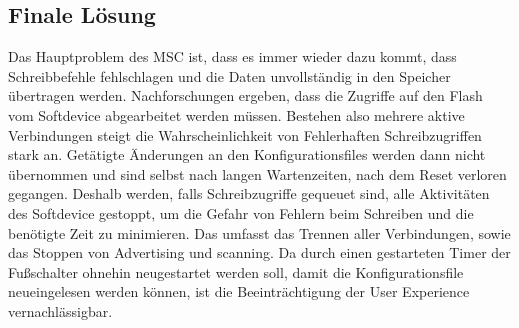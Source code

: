 \subsection{Finale Lösung}
Das Hauptproblem des MSC ist, dass es immer wieder dazu kommt, dass Schreibbefehle fehlschlagen und die Daten unvollständig in den Speicher übertragen werden. Nachforschungen ergeben, dass die Zugriffe auf den Flash vom Softdevice abgearbeitet werden müssen. Bestehen also mehrere aktive Verbindungen steigt die Wahrscheinlichkeit von Fehlerhaften Schreibzugriffen stark an. Getätigte Änderungen an den Konfigurationsfiles werden dann nicht übernommen und sind selbst nach langen Wartenzeiten, nach dem Reset verloren gegangen. Deshalb werden, falls Schreibzugriffe gequeuet sind, alle Aktivitäten des Softdevice gestoppt, um die Gefahr von Fehlern beim Schreiben und die benötigte Zeit zu minimieren. Das umfasst das Trennen aller Verbindungen, sowie das Stoppen von Advertising und scanning. Da durch einen gestarteten Timer der Fußschalter ohnehin neugestartet werden soll, damit die Konfigurationsfile neueingelesen werden können, ist die Beeinträchtigung der User Experience vernachlässigbar. 

